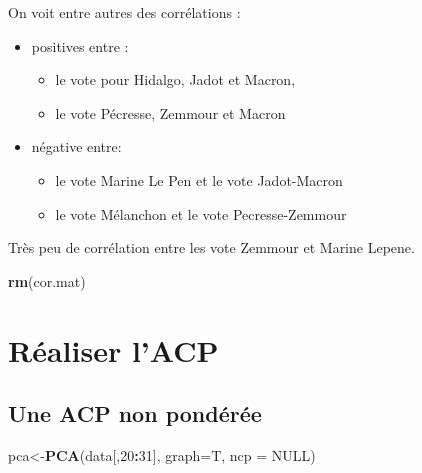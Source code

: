 \documentclass[
]{book}
\newenvironment{Shaded}{\begin{snugshade}}{\end{snugshade}}
\newcommand{\AttributeTok}[1]{\textcolor[rgb]{0.13,0.29,0.53}{#1}}
\newcommand{\ConstantTok}[1]{\textcolor[rgb]{0.56,0.35,0.01}{#1}}
\newcommand{\DecValTok}[1]{\textcolor[rgb]{0.00,0.00,0.81}{#1}}
\newcommand{\FunctionTok}[1]{\textcolor[rgb]{0.13,0.29,0.53}{\textbf{#1}}}
\newcommand{\NormalTok}[1]{#1}
\newcommand{\OtherTok}[1]{\textcolor[rgb]{0.56,0.35,0.01}{#1}}
\newcommand{\SpecialCharTok}[1]{\textcolor[rgb]{0.81,0.36,0.00}{\textbf{#1}}}
\begin{document}
On voit entre autres des corrélations :

\begin{itemize}
\item
  positives entre :

  \begin{itemize}
  \item
    le vote pour Hidalgo, Jadot et Macron,
  \item
    le vote Pécresse, Zemmour et Macron
  \end{itemize}
\item
  négative entre:

  \begin{itemize}
  \item
    le vote Marine Le Pen et le vote Jadot-Macron
  \item
    le vote Mélanchon et le vote Pecresse-Zemmour
  \end{itemize}
\end{itemize}

Très peu de corrélation entre les vote Zemmour et Marine Lepene.

\begin{Shaded}
\begin{Highlighting}[]
\FunctionTok{rm}\NormalTok{(cor.mat)}
\end{Highlighting}
\end{Shaded}

\hypertarget{ruxe9aliser-lacp}{%
\section{Réaliser l'ACP}\label{ruxe9aliser-lacp}}

\hypertarget{une-acp-non-ponduxe9ruxe9e}{%
\subsection{Une ACP non pondérée}\label{une-acp-non-ponduxe9ruxe9e}}

\begin{Shaded}
\begin{Highlighting}[]
\NormalTok{pca}\OtherTok{\textless{}{-}}\FunctionTok{PCA}\NormalTok{(data[,}\DecValTok{20}\SpecialCharTok{:}\DecValTok{31}\NormalTok{], }\AttributeTok{graph=}\NormalTok{T, }\AttributeTok{ncp =} \ConstantTok{NULL}\NormalTok{)}
\end{Highlighting}
\end{Shaded}
\end{document}

